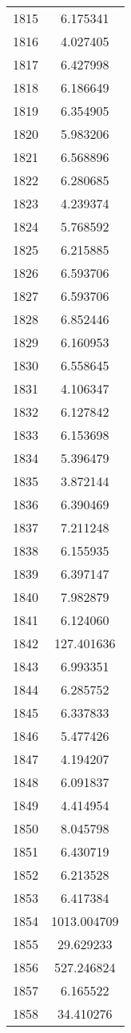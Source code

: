 \documentclass[12pt]{article}
\begin{document}
\begin{longtable}{@{}cc@{}}
1815 & 6.175341 \\
1816 & 4.027405 \\
1817 & 6.427998 \\
1818 & 6.186649 \\
1819 & 6.354905 \\
1820 & 5.983206 \\
1821 & 6.568896 \\
1822 & 6.280685 \\
1823 & 4.239374 \\
1824 & 5.768592 \\
1825 & 6.215885 \\
1826 & 6.593706 \\
1827 & 6.593706 \\
1828 & 6.852446 \\
1829 & 6.160953 \\
1830 & 6.558645 \\
1831 & 4.106347 \\
1832 & 6.127842 \\
1833 & 6.153698 \\
1834 & 5.396479 \\
1835 & 3.872144 \\
1836 & 6.390469 \\
1837 & 7.211248 \\
1838 & 6.155935 \\
1839 & 6.397147 \\
1840 & 7.982879 \\
1841 & 6.124060 \\
1842 & 127.401636 \\
1843 & 6.993351 \\
1844 & 6.285752 \\
1845 & 6.337833 \\
1846 & 5.477426 \\
1847 & 4.194207 \\
1848 & 6.091837 \\
1849 & 4.414954 \\
1850 & 8.045798 \\
1851 & 6.430719 \\
1852 & 6.213528 \\
1853 & 6.417384 \\
1854 & 1013.004709 \\
1855 & 29.629233 \\
1856 & 527.246824 \\
1857 & 6.165522 \\
1858 & 34.410276 \\

\end{longtable}
\end{document}
